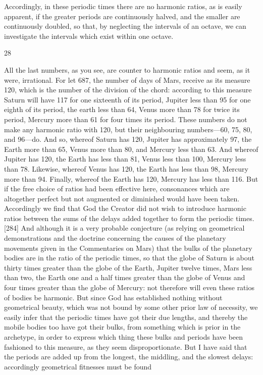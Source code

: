 \documentclass{article}
\begin{document}
Accordingly, in these periodic times there are no harmonic ratios, as is
easily apparent, if the greater periods are continuously halved, and the
smaller are continuously doubled, so that, by neglecting the intervals of
an octave, we can investigate the intervals which exist within one octave.


28

All the last numbers, as you see, are counter to harmonic ratios and
seem, as it were, irrational. For let 687, the number of days of Mars,
receive as its measure 120, which is the number of the division of the
chord: according to this measure Saturn will have 117 for one sixteenth of
its period, Jupiter less than 95 for one eighth of its period, the earth less
than 64, Venus more than 78 for twice its period, Mercury more than 61
for four times its period. These numbers do not make any harmonic ratio
with 120, but their neighbouring numbers—60, 75, 80, and 96—do. And
so, whereof Saturn has 120, Jupiter has approximately 97, the Earth
more than 65, Venus more than 80, and Mercury less than 63. And
whereof Jupiter has 120, the Earth has less than 81, Venus less than 100,
Mercury less than 78. Likewise, whereof Venus has 120, the Earth has
less than 98, Mercury more than 94. Finally, whereof the Earth has 120,
Mercury has less than 116. But if the free choice of ratios had been
effective here, consonances which are altogether perfect but not
augmented or diminished would have been taken. Accordingly we find
that God the Creator did not wish to introduce harmonic ratios between
the sums of the delays added together to form the periodic times.
[284] And although it is a very probable conjecture (as relying on
geometrical demonstrations and the doctrine concerning the causes of
the planetary movements given in the Commentaries on Mars) that the
bulks of the planetary bodies are in the ratio of the periodic times, so
that the globe of Saturn is about thirty times greater than the globe of the
Earth, Jupiter twelve times, Mars less than two, the Earth one and a half
times greater than the globe of Venus and four times greater than the
globe of Mercury: not therefore will even these ratios of bodies be
harmonic.
But since God has established nothing without geometrical beauty,
which was not bound by some other prior law of necessity, we easily infer
that the periodic times have got their due lengths, and thereby the
mobile bodies too have got their bulks, from something which is prior in
the archetype, in order to express which thing these bulks and periods
have been fashioned to this measure, as they seem disproportionate. But
I have said that the periods are added up from the longest, the middling,
and the slowest delays: accordingly geometrical fitnesses must be found
\end{document}
